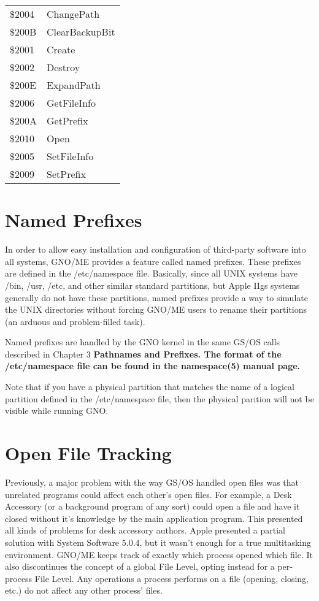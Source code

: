 \documentclass{report}
\begin{document}

\begin{tabular}{ll}
\$2004 & ChangePath \\
\$200B & ClearBackupBit \\
\$2001 & Create \\
\$2002 & Destroy \\
\$200E & ExpandPath \\
\$2006 & GetFileInfo \\
\$200A & GetPrefix \\
\$2010 & Open \\
\$2005 & SetFileInfo \\
\$2009 & SetPrefix \\
\end{tabular}


\section{Named Prefixes}

In order to allow easy installation and
configuration of third-party software into all systems, GNO/ME
provides a feature called named prefixes. These prefixes are
defined in the 
/etc/namespace file. Basically, since all UNIX
systems have /bin, /usr, /etc, and other similar standard
partitions, but Apple IIgs systems generally do not have these
partitions, named prefixes provide a way to simulate the UNIX
directories without forcing GNO/ME users to rename their
partitions (an arduous and problem-filled task).

Named prefixes are handled by the GNO
kernel in the same GS/OS calls described in Chapter 3 \bf Pathnames
and Prefixes\rm.
The format of the /etc/namespace file can be found in the
\bf namespace\rm(5) manual page.

Note that if you have a physical partition that matches the name of a
logical partition defined in the /etc/namespace file, then the physical
parition will not be visible while running GNO.

\section{Open File Tracking}

Previously, a major problem with the way
GS/OS handled open files was that unrelated programs could affect
each other's open files. For example, a Desk Accessory (or a
background program of any sort) could open a file and have it
closed without it's knowledge by the main application program.
This presented all kinds of problems for desk accessory authors.
Apple presented a partial solution with System Software 5.0.4,
but it wasn't enough for a true multitasking environment. GNO/ME
keeps track of exactly which process opened which file. It also
discontinues the concept of a global File Level, opting instead
for a per-process File Level. Any operations a process performs
on a file (opening, closing, etc.) do not affect any other
process' files.
\end{document}
